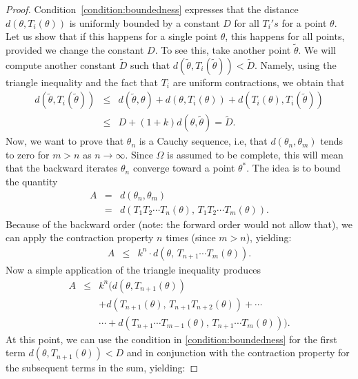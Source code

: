 \documentclass[10pt]{article} %
\theoremstyle{plain}
\theoremstyle{definition}
\theoremstyle{remark}
\begin{document}
\begin{proof}
    Condition~\cref{condition:boundedness} expresses that the distance $d(\theta, T_i(\theta))$ is uniformly bounded by a constant $D$ for all $T_i's$ for a point $\theta$. Let us show that if this happens for a single point $\theta$, this happens for all points, provided we change the constant $D$. To see this, take another point $\tilde \theta$. We will compute another constant $\tilde D$ such that $d(\tilde \theta, T_i(\tilde \theta)) < \tilde D$. Namely, using the triangle inequality and the fact that $T_i$ are uniform contractions, we obtain that
    \begin{eqnarray*}
        d(\tilde \theta,T_i(\tilde \theta)) 
        & \leq & d(\tilde \theta, \theta)+d(\theta,T_i(\theta))+d(T_i( \theta),T_i (\tilde \theta)) \\
        & \leq & D+(1+k)d(\theta, \tilde \theta) = \tilde D.
    \end{eqnarray*}
    Now, we want to prove that $\theta_n$ is a Cauchy sequence, i.e, that $d(\theta_n, \theta_m)$ tends to zero for $m>n$ as $n\rightarrow \infty$. Since $\Omega$ is assumed to be complete, this will mean that the backward iterates $\theta_n$ converge toward a point $\theta^*$.  
    The idea is to bound the quantity
    \begin{eqnarray*}
    A & = &  d(\theta_n, \theta_m) \\
      & = & d(T_{1}T_{2}\cdots T_{n}(\theta),\,T_{1}T_{2}\cdots T_{m}(\theta)).
    \end{eqnarray*}
    Because of the backward order (note: the forward order would not allow that), we can apply the contraction property $n$ times (since $m> n$), yielding:
    \begin{eqnarray*}
        A & \leq & k^{n}\cdot d(\theta,\,T_{n+1}\cdots T_{m}(\theta)).
    \end{eqnarray*}
Now a simple application of the triangle inequality produces
    \begin{eqnarray*}
        A & \leq &  k^{n}\Big(d(\theta,T_{n+1}(\theta)) \\
          &      & + d(T_{n+1}(\theta),\,T_{n+1}T_{n+2}(\theta))+\cdots\\
          &      & \cdots +d(T_{n+1}\cdots T_{m-1}(\theta),\,T_{n+1}\cdots T_{m}(\theta))\Big).
    \end{eqnarray*}
At this point, we can use the condition in \cref{condition:boundedness} for the first term $d(\theta,T_{n+1}(\theta)) < D$ and in conjunction with the contraction property for the subsequent terms in the sum, yielding:

\end{proof}
\end{document}
